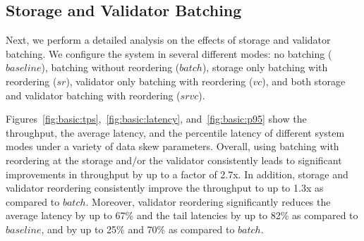 \subsection{Storage and Validator Batching}
\label{subsec:experiment:batching}

Next, we perform a detailed analysis on the effects of storage and validator batching. We configure the system in several different modes: no batching ($baseline$), batching without reordering ($batch$), storage only batching with reordering ($sr$), validator only batching with reordering
($vc$), and both storage and validator batching with reordering ($srvc$).




Figures~\ref{fig:basic:tps},~\ref{fig:basic:latency}, and~\ref{fig:basic:p95} show the throughput, the average latency, and the percentile latency of different system modes under a variety of data skew parameters. Overall, using batching with reordering at the storage and/or the validator consistently leads to significant improvements in throughput by up to a factor of 2.7x. In addition, storage and validator reordering consistently improve the throughput to up to 1.3x as compared to $batch$. Moreover, validator reordering significantly reduces the average latency by up to 67\% and the tail latencies by up to 82\% as compared to $baseline$, and by up to 25\% and 70\% as compared to $batch$.

